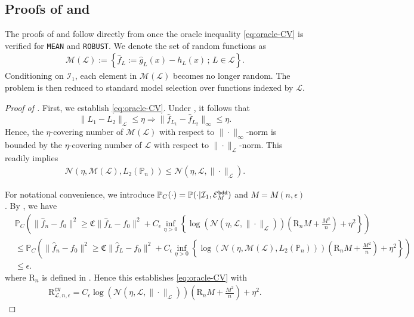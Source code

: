 \documentclass[12pt]{article}
\begin{document}
\begin{appendices}
\subsection{Proofs of  and }
The proofs of  and  follow directly from  once the oracle inequality \eqref{eq:oracle-CV} is verified for \texttt{MEAN} and \texttt{ROBUST}. We denote the set of random functions as 
 	\begin{align*}
		\mathcal{M}(\mathcal{L}) := \left\{\widehat f_{L} := \widehat g_{L}(x) - h_L(x)\,; \, L \in \mathcal{L}\right\}.
	\end{align*}
Conditioning on $\mathcal{I}_1$, each element in $\mathcal{M}(\mathcal{L})$ becomes no longer random. The problem is then reduced to standard model selection over functions indexed by $\mathcal{L}$.
\begin{proof}[Proof of ]
    First, we establish \eqref{eq:oracle-CV}. Under , it follows that 
    \[\|L_1 - L_2\|_\mathcal{L} \le \eta \Rightarrow \|\widehat f_{L_1}-\widehat f_{L_2}\|_\infty \le \eta.\]
    Hence, the $\eta$-covering number of $\mathcal{M}(\mathcal{L})$ with respect to $\|\cdot\|_\infty$-norm is bounded by the $\eta$-covering number of $\mathcal{L}$ with respect to $\|\cdot\|_{\mathcal{L}}$-norm. This readily implies 
    \begin{align*}
        \mathcal{N}(\eta, \mathcal{M}(\mathcal{L}), L_2(\mathbb{P}_n)) \le \mathcal{N}(\eta, \mathcal{L}, \|\cdot\|_{\mathcal{L}}).
    \end{align*}

For notational convenience, we introduce $\mathbb{P}_C(\cdot) = \mathbb{P}(\cdot | \mathcal{I}_1, \mathcal{E}_{M}^{\tt bdd})$ and $M = M(n, \epsilon)$. By , we have 
\begin{align*}
&\mathbb{P}_C\left(\|\widehat{f}_n - f_0\|^2\ge \mathfrak{C}\|\widehat{f}_{L} - f_0\|^2 + C_\epsilon\inf _{\eta>0}\left\{\log \left(\mathcal{N}\left(\eta, \mathcal{L}, \|\cdot\|_{\mathcal{L}}\right)\right)\left(\mathrm{R}_n M+\frac{ M^2}{n}\right)+\eta^2\right\}\right) \\
    &\le \mathbb{P}_C\left(\|\widehat{f}_n - f_0\|^2\ge \mathfrak{C}\|\widehat{f}_{L} - f_0\|^2 + C_\epsilon\inf _{\eta>0}\left\{\log \left(\mathcal{N}\left(\eta, \mathcal{M}(\mathcal{L}), L_2\left(\mathbb{P}_n\right)\right)\right)\left(\mathrm{R}_n M+\frac{ M^2}{n}\right)+\eta^2\right\}\right) \\
    &\le \epsilon.
\end{align*}
where $\mathrm{R}_n$ is defined in . Hence this establishes \eqref{eq:oracle-CV} with
    \begin{align*}
    \mathrm{R}_{\mathcal{L}, n, \epsilon}^{\mathtt{CV}} = C_\epsilon \log \left(\mathcal{N}\left(\eta, \mathcal{L}, \|\cdot\|_{\mathcal{L}}\right)\right)\left(\mathrm{R}_n M+\frac{M^2}{n }\right)+\eta^2.
\end{align*}
	

\end{proof}
\end{appendices}
\end{document}
